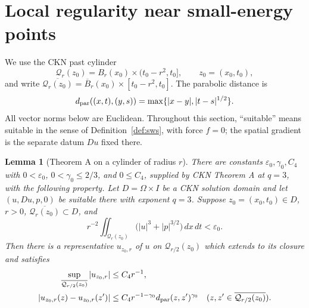 \documentclass[11pt,letterpaper]{article}
\numberwithin{equation}{section}
\theoremstyle{plain}
\newtheorem{lemma}[theorem]{Lemma}
\theoremstyle{definition}
\theoremstyle{remark}
\begin{document}
\section{Local regularity near small-energy points}\label{sec:local-regularity}

We use the CKN past cylinder
\[
  \mathcal Q_r(z_0)=B_r(x_0)\times(t_0-r^2,t_0],
  \qquad z_0=(x_0,t_0),
\]
and write $\overline{\mathcal Q_r(z_0)}=\overline B_r(x_0)\times
[t_0-r^2,t_0]$.  The parabolic distance is
\[
  d_{\rm par}((x,t),(y,s))=\max\{|x-y|,|t-s|^{1/2}\}.
\]
All vector norms below are Euclidean.
Throughout this section, ``suitable'' means suitable in the sense of
Definition~\ref{def:sws}, with force $f=0$; the spatial gradient is the
separate datum $Du$ fixed there.

\begin{lemma}[Theorem A on a cylinder of radius $r$]\label{lem:thmA-rescaled}
There are constants $\varepsilon_0,\gamma_0,C_4$ with
$0<\varepsilon_0$, $0<\gamma_0\le 2/3$, and $0\le C_4$, supplied by
CKN Theorem A at $q=3$, with the following property.  Let $D=\Omega\times I$ be a CKN
solution domain and let $(u,Du,p,0)$ be suitable there with exponent $q=3$.
Suppose $z_0=(x_0,t_0)\in D$, $r>0$,
$\overline{\mathcal Q_r(z_0)}\subset D$, and
\begin{equation}\label{eq:thmA-rescaled-smallness}
 r^{-2}\iint_{\mathcal Q_r(z_0)}
       \bigl(|u|^3+|p|^{3/2}\bigr)\,dx\,dt<\varepsilon_0.
\end{equation}
Then there is a representative $u_{z_0,r}$ of $u$ on
$\mathcal Q_{r/2}(z_0)$ which extends to its closure and satisfies
\begin{align*}
 \sup_{\overline{\mathcal Q_{r/2}(z_0)}}|u_{z_0,r}|&\le C_4r^{-1},\\
 |u_{z_0,r}(z)-u_{z_0,r}(z')|&\le
 C_4r^{-1-\gamma_0}d_{\rm par}(z,z')^{\gamma_0}
 \quad(z,z'\in\overline{\mathcal Q_{r/2}(z_0)}).
\end{align*}
\end{lemma}
\end{document}
